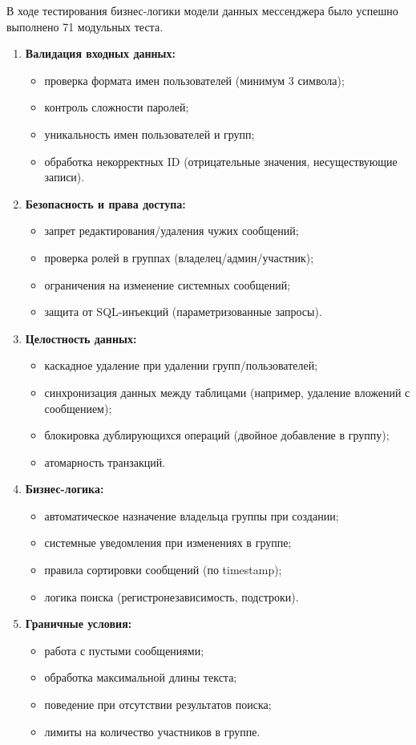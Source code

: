 В ходе тестирования бизнес-логики модели данных мессенджера было успешно выполнено 71 модульных теста.

\begin{enumerate}
	\item \textbf{Валидация входных данных:}
	\begin{itemize}
		\item проверка формата имен пользователей (минимум 3 символа);
		\item контроль сложности паролей;
		\item уникальность имен пользователей и групп;
		\item обработка некорректных ID (отрицательные значения, несуществующие записи).
	\end{itemize}
	
	\item \textbf{Безопасность и права доступа:}
	\begin{itemize}
		\item запрет редактирования/удаления чужих сообщений;
		\item проверка ролей в группах (владелец/админ/участник);
		\item ограничения на изменение системных сообщений;
		\item защита от SQL-инъекций (параметризованные запросы).
	\end{itemize}
	
	\item \textbf{Целостность данных:}
	\begin{itemize}
		\item каскадное удаление при удалении групп/пользователей;
		\item синхронизация данных между таблицами (например, удаление вложений с сообщением);
		\item блокировка дублирующихся операций (двойное добавление в группу);
		\item атомарность транзакций.
	\end{itemize}
	
	\item \textbf{Бизнес-логика:}
	\begin{itemize}
		\item автоматическое назначение владельца группы при создании;
		\item системные уведомления при изменениях в группе;
		\item правила сортировки сообщений (по timestamp);
		\item логика поиска (регистронезависимость, подстроки).
	\end{itemize}
	
	\item \textbf{Граничные условия:}
	\begin{itemize}
		\item работа с пустыми сообщениями;
		\item обработка максимальной длины текста;
		\item поведение при отсутствии результатов поиска;
		\item лимиты на количество участников в группе.
	\end{itemize}
\end{enumerate}

